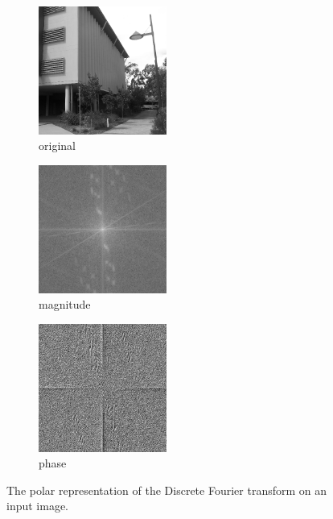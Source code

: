 \begin{figure}[t!] 
        \centering
        \begin{subfigure}[b]{4.5cm}
                \includegraphics[width=4.2cm]{images/pc/original}
                \caption{original}
                \label{fig:PCSecOrig1}
        \end{subfigure}%
        \begin{subfigure}[b]{4.5cm}
                \includegraphics[width=4.2cm]{images/pc/magnitude}
                \caption{magnitude}
                \label{fig:PCSecMag}
        \end{subfigure}%
                \begin{subfigure}[b]{4.5cm}
                \includegraphics[width=4.2cm]{images/pc/phase}
                \caption{phase}
                \label{fig:PCSecPhase}
        \end{subfigure}%
       \caption{The polar representation of the Discrete Fourier transform on an input image.}\label{fig:PCSecA}
\end{figure}

